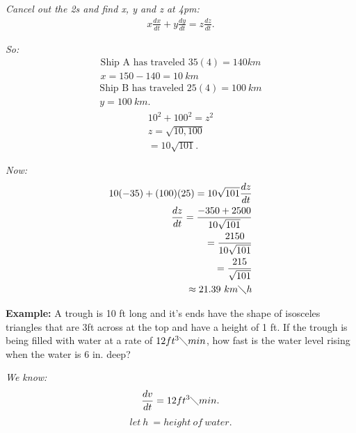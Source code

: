 \documentclass{report}
\begin{document}
    \bigbreak \noindent 
    \textit{Cancel out the 2s and find x, y and z at 4pm:}
    \begin{align*}
      x \frac{dx}{dt} + y \frac{dy}{dt} = z \frac{dz}{dt}
    .\end{align*}

    \bigbreak \noindent
    \textit{So:}
    \begin{align*}
      \text{Ship A has traveled $35(4) = 140 km$} \\
      x = 150 - 140 = 10\ km
    \end{align*}
    \begin{align*}
      \text{Ship B has traveled $25(4) = 100\ km$} \\
      y = 100\ km
    .\end{align*}
    \begin{align*}
      10^{2} + 100^{2} = z^{2} \\ 
      z = \sqrt{10,100} \\ 
      = 10\sqrt{101}
    .\end{align*}

    \bigbreak \noindent
    \textit{Now:}
    \begin{align*}
      10(-35) + (100)(25) = 10\sqrt{101} \frac{dz}{dt} \\ 
      \frac{dz}{dt} = \frac{-350 + 2500}{10\sqrt{101}} \\ 
      = \frac{2150}{10\sqrt{101}} \\
      = \frac{215}{\sqrt{101}} \\
      \approx 21.39\ km \diagdown h
    \end{align*}

    \pagebreak \bigbreak \noindent
    \begin{mdframed}
      \textbf{Example:}
      A trough is 10 ft long and it's ends have the shape of isosceles triangles 
      that are 3ft across at the top and have a height of 1 ft. If the trough is 
      being filled with water at a rate of $12ft^{3} \diagdown min$, how fast
      is the water level rising when the water is 6 in. deep? 
    \end{mdframed}

    \bigbreak \noindent 
    \textit{We know:}
    \begin{align*}
      \frac{dv}{dt} = 12 ft^{3} \diagdown min
    .\end{align*}
    \begin{align*}
      let\ h\  = height\ of\ water
    .\end{align*}
\end{document}
